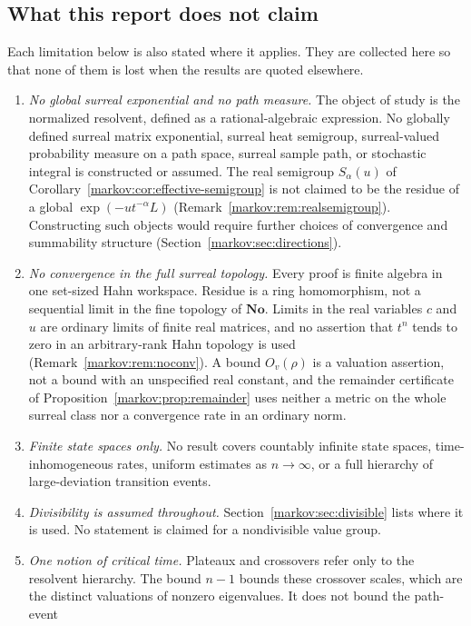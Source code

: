 \documentclass[11pt]{article}
\numberwithin{equation}{section}
\theoremstyle{definition}
\theoremstyle{remark}
\newcommand{\No}{\mathbf{No}}
\newcommand{\bigO}[1]{O_v(#1)}
\begin{document}
\subsection{What this report does not claim}\label{markov:sec:nonclaims}

Each limitation below is also stated where it applies. They are collected here
so that none of them is lost when the results are quoted elsewhere.
\begin{enumerate}[label=(N\arabic*),leftmargin=3.2em]
\item \emph{No global surreal exponential and no path measure.} The object of
study is the normalized resolvent, defined as a rational-algebraic expression.
No globally defined surreal matrix exponential, surreal heat semigroup,
surreal-valued probability measure on a path space, surreal sample path, or
stochastic integral is constructed or assumed. The real semigroup
$S_\alpha(u)$ of Corollary~\ref{markov:cor:effective-semigroup} is not claimed
to be the residue of a global $\exp(-ut^{-\alpha}L)$
(Remark~\ref{markov:rem:realsemigroup}). Constructing such objects would
require further choices of convergence and summability structure
(Section~\ref{markov:sec:directions}).
\item \emph{No convergence in the full surreal topology.} Every proof is finite
algebra in one set-sized Hahn workspace. Residue is a ring homomorphism, not a
sequential limit in the fine topology of $\No$. Limits in the real variables $c$
and $u$ are ordinary limits of finite real matrices, and no assertion that
$t^n$ tends to zero in an arbitrary-rank Hahn topology is used
(Remark~\ref{markov:rem:noconv}). A bound $\bigO{\rho}$ is a valuation
assertion, not a bound with an unspecified real constant, and the remainder
certificate of Proposition~\ref{markov:prop:remainder} uses neither a metric on
the whole surreal class nor a convergence rate in an ordinary norm.
\item \emph{Finite state spaces only.} No result covers countably infinite
state spaces, time-inhomogeneous rates, uniform estimates as $n\to\infty$, or a
full hierarchy of large-deviation transition events.
\item \emph{Divisibility is assumed throughout.} Section~\ref{markov:sec:divisible}
lists where it is used. No statement is claimed for a nondivisible value group.
\item \emph{One notion of critical time.} Plateaux and crossovers refer only to
the resolvent hierarchy. The bound $n-1$ bounds these crossover scales, which
are the distinct valuations of nonzero eigenvalues. It does not bound the path-event

\end{enumerate}
\end{document}
